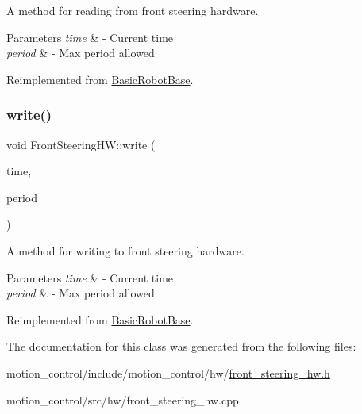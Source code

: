 A method for reading from front steering hardware. 


\begin{DoxyParams}{Parameters}
{\em time} & -\/ Current time \\
\hline
{\em period} & -\/ Max period allowed \\
\hline
\end{DoxyParams}


Reimplemented from \hyperlink{classBasicRobotBase_a64bb2c7bed72e98fb62a37d6beb4fe5a}{Basic\+Robot\+Base}.

\mbox{\label{classFrontSteeringHW_aa0e57cc4919044aecb7d1c76c8d4ac21}} 
\subsubsection{\texorpdfstring{write()}{write()}}
{\footnotesize\ttfamily void Front\+Steering\+H\+W\+::write (\begin{DoxyParamCaption}\item[{const ros\+::\+Time \&}]{time,  }\item[{const ros\+::\+Duration \&}]{period }\end{DoxyParamCaption})\hspace{0.3cm}{\ttfamily [virtual]}}



A method for writing to front steering hardware. 


\begin{DoxyParams}{Parameters}
{\em time} & -\/ Current time \\
\hline
{\em period} & -\/ Max period allowed \\
\hline
\end{DoxyParams}


Reimplemented from \hyperlink{classBasicRobotBase_afbc6ef4347fc05e053391692a9e1bc24}{Basic\+Robot\+Base}.



The documentation for this class was generated from the following files\+:\begin{DoxyCompactItemize}
\item 
motion\+\_\+control/include/motion\+\_\+control/hw/\hyperlink{front__steering__hw_8h}{front\+\_\+steering\+\_\+hw.\+h}\item 
motion\+\_\+control/src/hw/front\+\_\+steering\+\_\+hw.\+cpp\end{DoxyCompactItemize}
